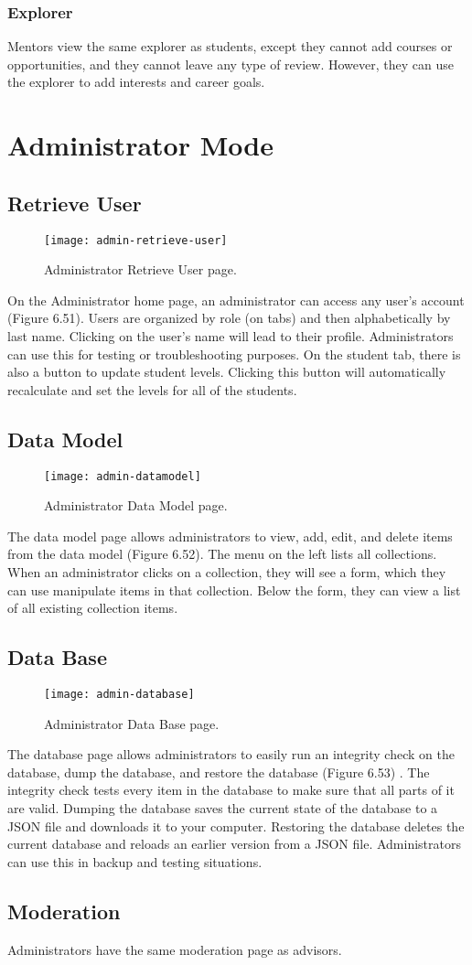\subsubsection{Explorer}
Mentors view the same explorer as students, except they cannot add courses or opportunities, and they cannot leave any type of review. However, they can use the explorer to add interests and career goals.

\section{Administrator Mode}
\subsection{Retrieve User}
\begin{figure}[htbp!]
\centering
\texttt{[image: admin-retrieve-user]}
\caption{Administrator Retrieve User page.}
\end{figure}
On the Administrator home page, an administrator can access any user's account (Figure 6.51). Users are organized by role (on tabs) and then alphabetically by last name. Clicking on the user's name will lead to their profile. Administrators can use this for testing or troubleshooting purposes. On the student tab, there is also a button to update student levels. Clicking this button will automatically recalculate and set the levels for all of the students.

\subsection{Data Model}
\begin{figure}[htbp!]
\centering
\texttt{[image: admin-datamodel]}
\caption{Administrator Data Model page.}
\end{figure}
The data model page allows administrators to view, add, edit, and delete items from the data model (Figure 6.52). The menu on the left lists all collections. When an administrator clicks on a collection, they will see a form, which they can use manipulate items in that collection. Below the form, they can view a list of all existing collection items. 
\subsection{Data Base}
\begin{figure}[htbp!]
\centering
\texttt{[image: admin-database]}
\caption{Administrator Data Base page.}
\end{figure}
The database page allows administrators to easily run an integrity check on the database, dump the database, and restore the database (Figure 6.53)
. The integrity check tests every item in the database to make sure that all parts of it are valid. Dumping the database saves the current state of the database to a JSON file and downloads it to your computer. Restoring the database deletes the current database and reloads an earlier version from a JSON file. Administrators can use this in backup and testing situations.
\subsection{Moderation}
Administrators have the same moderation page as advisors. 